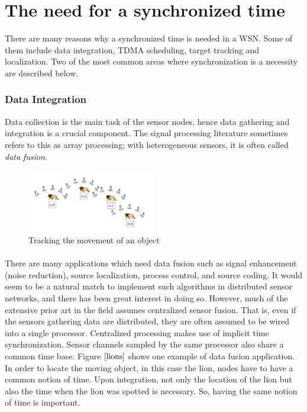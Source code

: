 \documentclass[a4paper,10pt]{report}
\begin{document}
\section{\textbf{The need for a synchronized time}}
There are many reasons why a synchronized time is needed in a WSN. Some of them include data integration, TDMA scheduling, target
tracking and localization. Two of the most common areas where synchronization is a necessity are described below.
\subsubsection{Data Integration}
Data collection is the main task of the sensor nodes, hence data gathering and integration is a crucial component. The signal processing literature sometimes refers to this as array processing; with heterogeneous sensors, it is often called \textit{data fusion}.
\begin{figure}
\centering
\includegraphics[width= 0.5\textwidth]{lions}
\caption{Tracking the movement of an object}
\label{lions}
\end{figure}
\paragraph*{}
There are many applications which need data fusion such as signal enhancement (noise reduction), source localization, process control,
and source coding. It would seem to be a natural match to implement such algorithms in distributed sensor networks, and there has been
great interest in doing so. However, much of the extensive prior art in the field assumes centralized sensor fusion. That is, even if the sensors gathering data are distributed, they are often assumed to be wired into a single processor. Centralized processing makes use of implicit time synchronization. Sensor channels sampled by the same processor also share a common time base. Figure $\ref{lions}$ shows one example of data fusion application. In order to locate the moving object, in this case the lion, nodes have to have a common notion of time. Upon integration, not only the location of the lion but also the time when the lion was spotted is necessary. So, having the same notion of time is important.
\end{document}
